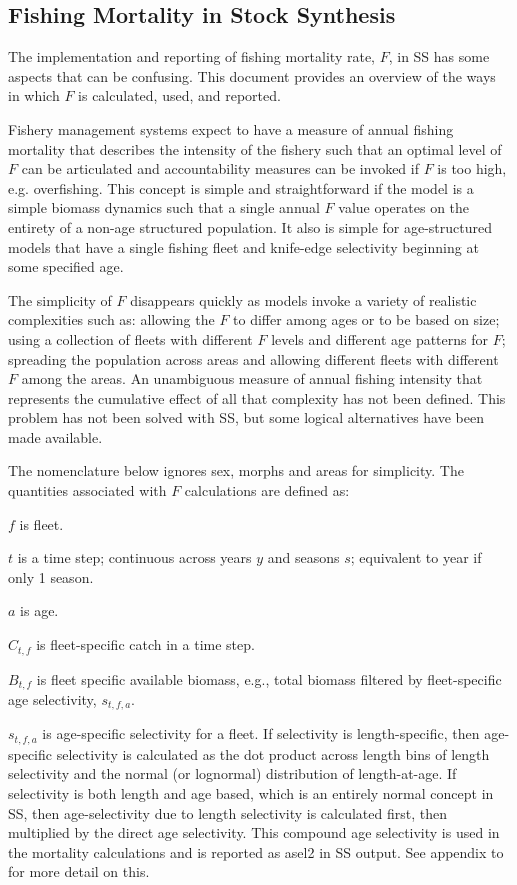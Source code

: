 \subsection{Fishing Mortality in Stock Synthesis}

The implementation and reporting of fishing mortality rate, $F$, in SS has some aspects that can be confusing.  This document provides an overview of the ways in which $F$ is calculated, used, and reported.  

Fishery management systems expect to have a measure of annual fishing mortality that describes the intensity of the fishery such that an optimal level of $F$ can be articulated and accountability measures can be invoked if $F$ is too high, e.g. overfishing.  This concept is simple and straightforward if the model is a simple biomass dynamics such that a single annual $F$ value operates on the entirety of a non-age structured population.  It also is simple for age-structured models that have a single fishing fleet and knife-edge selectivity beginning at some specified age.

The simplicity of $F$ disappears quickly as models invoke a variety of realistic complexities such as: allowing the $F$ to differ among ages or to be based on size; using a collection of fleets with different $F$ levels and different age patterns for $F$; spreading the population across areas and allowing different fleets with different $F$ among the areas.  An unambiguous measure of annual fishing intensity that represents the cumulative effect of all that complexity has not been defined.  This problem has not been solved with SS, but some logical alternatives have been made available.

The nomenclature below ignores sex, morphs and areas for simplicity. The quantities associated with $F$ calculations are defined as:

$f$ is fleet.

$t$ is a time step; continuous across years $y$ and seasons $s$; equivalent to year if only 1 season.

$a$ is age.

$C_{t,f}$ is fleet-specific catch in a time step.

$B_{t,f}$ is fleet specific available biomass, e.g., total biomass filtered by fleet-specific age selectivity, $s_{t,f,a}$.

$s_{t,f,a}$ is age-specific selectivity for a fleet. If selectivity is length-specific, then age-specific selectivity is calculated as the dot product across length bins of length selectivity and the normal (or lognormal) distribution of length-at-age.  If selectivity is both length and age based, which is an entirely normal concept in SS, then age-selectivity due to length selectivity is calculated first, then multiplied by the direct age selectivity.  This compound age selectivity is used in the mortality calculations and is reported as asel2 in SS output.  See appendix to \citet{methot_stock_2013} for more detail on this.

